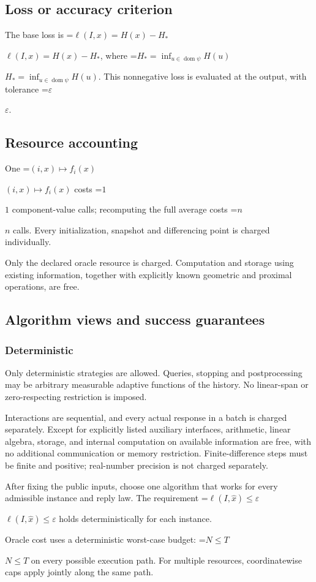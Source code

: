 \documentclass[10pt,a4paper]{article}
\newcommand{\AtlasMath}[1]{\par\begingroup\centering\setbox0=\hbox{$\displaystyle #1$}\ifdim\wd0>1.4\linewidth\typeout{ATLAS WIDE FORMULA: \the\wd0}\fi\ifdim\wd0>\linewidth\resizebox{\linewidth}{!}{\box0}\else\box0\fi\par\endgroup}
\newcommand{\AtlasInlineMath}[1]{\begingroup\setbox0=\hbox{$#1$}\ifdim\wd0>.4\linewidth\endgroup\AtlasMath{#1}\else\endgroup$#1$\fi}
\begin{document}
\subsection{Loss or accuracy criterion}
The base loss is \AtlasInlineMath{\ell(I,x)=H(x)-H_*}, where \AtlasInlineMath{H_*=\inf_{u\in \operatorname{dom}\psi}H(u)}. This nonnegative loss is evaluated at the output, with tolerance \AtlasInlineMath{\varepsilon}.

\subsection{Resource accounting}
One \AtlasInlineMath{(i,x)\mapsto f_i(x)} costs \AtlasInlineMath{1} component-value calls; recomputing the full average costs \AtlasInlineMath{n} calls. Every initialization, snapshot and differencing point is charged individually.

Only the declared oracle resource is charged. Computation and storage using existing information, together with explicitly known geometric and proximal operations, are free.

\subsection{Algorithm views and success guarantees}
\subsubsection{Deterministic}
Only deterministic strategies are allowed. Queries, stopping and postprocessing may be arbitrary measurable adaptive functions of the history. No linear-span or zero-respecting restriction is imposed.

Interactions are sequential, and every actual response in a batch is charged separately. Except for explicitly listed auxiliary interfaces, arithmetic, linear algebra, storage, and internal computation on available information are free, with no additional communication or memory restriction. Finite-difference steps must be finite and positive; real-number precision is not charged separately.

After fixing the public inputs, choose one algorithm that works for every admissible instance and reply law. The requirement \AtlasInlineMath{\ell(I,\widehat{x})\le \varepsilon} holds deterministically for each instance.

Oracle cost uses a deterministic worst-case budget: \AtlasInlineMath{N\le T} on every possible execution path. For multiple resources, coordinatewise caps apply jointly along the same path.
\end{document}
